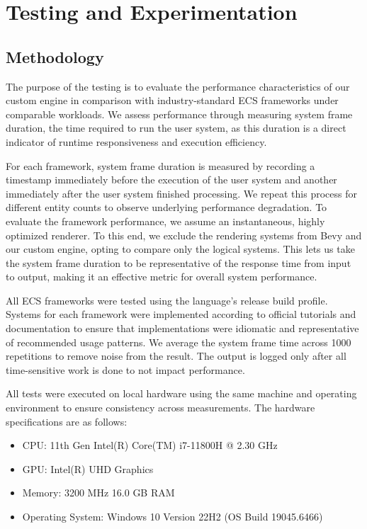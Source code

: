 \section{Testing and Experimentation}
\label{sec:testing}

\subsection{Methodology}
\label{subsec:methodology}

The purpose of the testing is to evaluate the performance characteristics of our custom engine in comparison with industry-standard
ECS frameworks under comparable workloads.
We assess performance through measuring system frame duration, the time required to run the user system,
as this duration is a direct indicator of runtime responsiveness and execution efficiency.

For each framework, system frame duration is measured by recording a timestamp immediately before the execution of
the user system and another immediately after the user system finished processing.
We repeat this process for different entity counts to observe underlying performance degradation.
To evaluate the framework performance, we assume an instantaneous, highly optimized renderer.
To this end, we exclude the rendering systems from Bevy and our custom engine, opting to compare only the logical systems.
This lets us take the system frame duration to be representative of the response time from input to output,
making it an effective metric for overall system performance.

All ECS frameworks were tested using the language’s release build profile.
Systems for each framework were implemented according to official tutorials and documentation
to ensure that implementations were idiomatic and representative of recommended usage patterns.
We average the system frame time across 1000 repetitions to remove noise from the result.
The output is logged only after all time-sensitive work is done to not impact performance.

All tests were executed on local hardware using the same machine and operating environment to ensure consistency across measurements.
The hardware specifications are as follows:

\begin{itemize}
    \item CPU: 11th Gen Intel(R) Core(TM) i7-11800H @ 2.30 GHz
    \item GPU: Intel(R) UHD Graphics
    \item Memory: 3200 MHz 16.0 GB RAM
    \item Operating System: Windows 10 Version 22H2 (OS Build 19045.6466)
\end{itemize}

